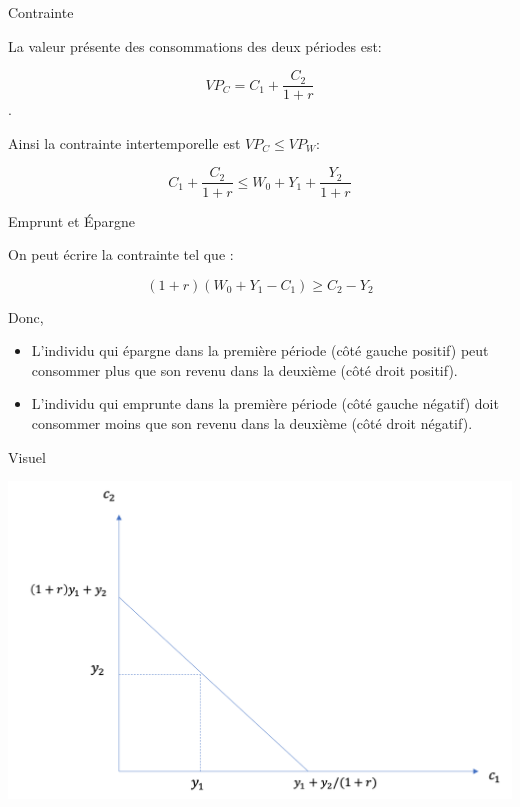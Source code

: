 \documentclass[handout]{beamer}
\begin{document}
\begin{frame}{Contrainte}

La valeur présente des consommations des deux périodes est: 

$$VP_C = C_1 + \frac{C_2}{1+r}$$. 

Ainsi la contrainte intertemporelle est $ VP_C \leq VP_W $:

$$ C_1 + \frac{C_2}{1+r} \leq W_0 + Y_1 + \frac{Y_2}{1+r}  $$

\end{frame}

\begin{frame}{Emprunt et Épargne}

On peut écrire la contrainte tel que :

$$ (1+r)(W_0 + Y_1 - C_1) \ge  C_2 - Y_2 $$

Donc,

\begin{itemize}
\item L'individu qui épargne dans la première période (côté gauche positif) peut consommer plus que son revenu dans la deuxième (côté droit positif).
\item L'individu qui emprunte dans la première période (côté gauche négatif) doit consommer moins que son revenu dans la deuxième (côté droit négatif).
\end{itemize}

\end{frame}


\begin{frame}{Visuel}

\includegraphics[scale=0.5]{budget.png}

\end{frame}
\end{document}
